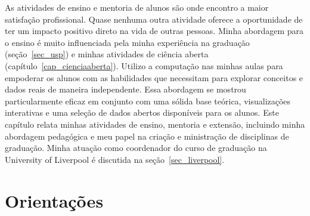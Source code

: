 \documentclass[12pt,a4paper,oneside]{book}
\newcommand{\UoL}{University of Liverpool}
\begin{document}
As atividades de ensino e mentoria de alunos são onde encontro a maior
satisfação profissional.
Quase nenhuma outra atividade oferece a oportunidade de ter um impacto positivo
direto na vida de outras pessoas.
Minha abordagem para o ensino é muito influenciada pela minha experiência na
graduação (seção~\ref{sec_usp}) e minhas atividades de ciência aberta
(capítulo~\ref{cap_cienciaaberta}).
Utilizo a computação nas minhas aulas para empoderar os alunos com as
habilidades que necessitam para explorar conceitos e dados reais de maneira
independente.
Essa abordagem se mostrou particularmente eficaz em conjunto com uma sólida
base teórica, visualizações interativas e uma seleção de dados abertos
disponíveis para os alunos.
Este capítulo relata minhas atividades de ensino, mentoria e extensão,
incluindo minha abordagem pedagógica e meu papel na criação e ministração de
disciplinas de graduação.
Minha atuação como coordenador do curso de graduação na \UoL{}
é discutida na seção~\ref{sec_liverpool}.

\section{Orientações}
\label{sec_orientacao}
\end{document}
